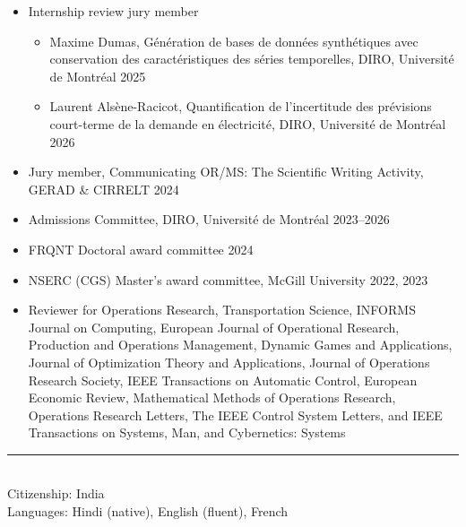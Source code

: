 \documentclass[12pt]{article}
\renewcommand{\section}[1]{
\vspace{0.25em}
\noindent{\normalfont\large\bfseries\color{black} #1}\par
\vspace{-0.24em}
\noindent\textcolor{black}{\rule{0.55\textwidth}{1.1pt}}
\vspace{0.48em}
}
\newenvironment{midlist}[1][\enskip\textbullet]%
        {\begin{itemize}[#1,leftmargin=*,parsep=0pt,itemsep=4pt,topsep=2pt,partopsep=0pt]}
        {\end{itemize}}
\begin{document}
\begin{midlist}
\begin{midlist}
\item Warley Almeida Silva, Dynamic Location Problems with Decision-Dependent Demands, Customer Preferences and Market Competition (Predoc III) \hfill{2023}
\item Gregory De Salaberry Seljak, Random Quasi Monte Carlo Methods (Predoc II)  \hfill{2024}
\end{midlist}
\vspace{2mm}
\item Internship review  jury member
\vspace{1mm}
\begin{midlist}
\item Maxime Dumas, Génération de bases de données synthétiques
avec conservation des caractéristiques des séries temporelles, DIRO, Université de Montréal \hfill{2025}
\item Laurent Alsène-Racicot, Quantification de l’incertitude des prévisions court-terme de la demande en électricité, DIRO, Université de Montréal \hfill{2026}
\end{midlist}
\vspace{2mm}    
\item Jury member, Communicating OR/MS: The Scientific Writing Activity, GERAD \& CIRRELT \hfill{2024}
\vspace{2mm}
\item Admissions Committee, DIRO, Université de Montréal \hfill{2023--2026}
\vspace{2mm}
\item  FRQNT Doctoral award committee \hfill{2024}
\vspace{2mm}
\item  NSERC (CGS) Master's award committee, McGill University  \hfill{2022, 2023}
\vspace{2mm}
\item Reviewer for Operations Research, Transportation Science, INFORMS Journal on Computing, European Journal of Operational Research, Production and Operations Management, Dynamic Games and Applications, Journal of Optimization Theory and Applications, Journal of Operations Research Society, IEEE Transactions on Automatic Control, European Economic Review,  Mathematical Methods of Operations Research, Operations Research Letters, The IEEE Control System Letters, and IEEE Transactions on Systems, Man, and Cybernetics: Systems\\
\end{midlist}

\section{Personal}
\\
{Citizenship}: India\\
{Languages}: Hindi (native), English (fluent), French 
\\
\end{document}
